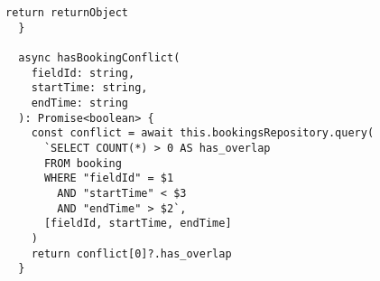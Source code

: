 \begin{lstlisting}[caption={\textit{Service} para a rota de criação de \textit{booking} (agendamento).},label={cod:create-booking-service}]
    return returnObject
  }

  async hasBookingConflict(
    fieldId: string,
    startTime: string,
    endTime: string
  ): Promise<boolean> {
    const conflict = await this.bookingsRepository.query(
      `SELECT COUNT(*) > 0 AS has_overlap
      FROM booking
      WHERE "fieldId" = $1
        AND "startTime" < $3
        AND "endTime" > $2`,
      [fieldId, startTime, endTime]
    )
    return conflict[0]?.has_overlap
  }
\end{lstlisting}